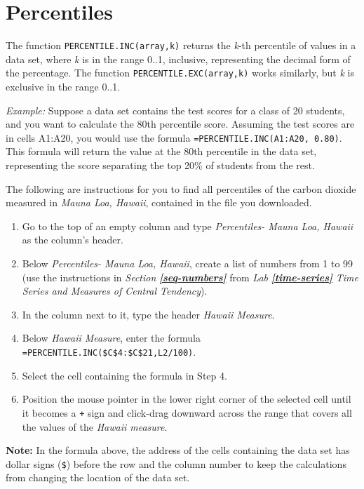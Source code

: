 \documentclass[
]{book}
\begin{document}
\hypertarget{percentiles}{%
\section{Percentiles}\label{percentiles}}

The function \texttt{PERCENTILE.INC(array,k)} returns the \emph{k}-th percentile of values in a data set, where \emph{k} is in the range 0..1, inclusive, representing the decimal form of the percentage. The function \texttt{PERCENTILE.EXC(array,k)} works similarly, but \emph{k} is exclusive in the range 0..1.

\emph{Example:} Suppose a data set contains the test scores for a class of 20 students, and you want to calculate the 80th percentile score. Assuming the test scores are in cells A1:A20, you would use the formula \texttt{=PERCENTILE.INC(A1:A20,\ 0.80)}. This formula will return the value at the 80th percentile in the data set, representing the score separating the top 20\% of students from the rest.

The following are instructions for you to find all percentiles of the carbon dioxide measured in \emph{Mauna Loa, Hawaii}, contained in the file you downloaded.

\begin{enumerate}
\def\labelenumi{\arabic{enumi}.}
\item
  Go to the top of an empty column and type \emph{Percentiles- Mauna Loa, Hawaii} as the column's header.
\item
  Below \emph{Percentiles- Mauna Loa, Hawaii}, create a list of numbers from 1 to 99 (use the instructions in \emph{Section} \textbf{\emph{\ref{seq-numbers}}} from \emph{Lab} \textbf{\emph{\ref{time-series}}} \emph{Time Series and Measures of Central Tendency}).
\item
  In the column next to it, type the header \emph{Hawaii Measure}.
\item
  Below \emph{Hawaii Measure}, enter the formula \texttt{=PERCENTILE.INC(\$C\$4:\$C\$21,L2/100)}.
\item
  Select the cell containing the formula in Step 4.
\item
  Position the mouse pointer in the lower right corner of the selected cell until it becomes a \texttt{+} sign and click-drag downward across the range that covers all the values of the \emph{Hawaii measure}.
\end{enumerate}

\textbf{Note:} In the formula above, the address of the cells containing the data set has dollar signs (\texttt{\$}) before the row and the column number to keep the calculations from changing the location of the data set.
\end{document}
